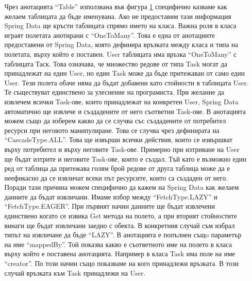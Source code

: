         \begin{figure}[h]
            \centering
            \caption{}
            \label{fig:user_entity}
        \end{figure}
        
        Чрез анотацията ``Table'' използвана във фигура \ref{fig:user_entity} специфично казваме как желаем таблицата да бъде именувана. Ако не предоставим тази информация Spring Data ще кръсти таблицата спрямо името на класа. Важна роля в класа играят полетата анотирани с ``OneToMany''. Това е една от анотациите предоставени от Spring Data, която дефинира връзката между класа и типа на полетата, върху който е поставен. User таблицата има връзка ``OneToMany'' с таблицата Таск. Това означава, че множество редове от типа Task могат да принадлежат на един User, но един Task може да бъде притежаван от само един User. Тези полета обаче няма да бъдат добавени като стойности в таблицата User. Те съществуват единствено за улеснение на програмиста. При желание да извлечем всички Task-ове, които принадлежат на конкретен User, Spring Data автоматично ще извлече и създадените от него съответни Task-ове.
        В анотацията можем също да изберем какво да се случва със създадените от потребител ресурси при неговото манипулиране. Това се случва чрез дефинирата на ``CascadeType.ALL''. Това ще извърши всички действия, които се извършват върху потребител и върху неговите Task-ове. Примерно при изтриване на User ще бъдат изтрите и неговите Task-ове, които е създал. 
        Тъй като е възможно един ред от таблица да притежава голям брой редове от друга таблица може да е неефикасно да се извличат всеки път ресурсите, които са създаден от него. Поради тази причина можем специфично да кажем на Spring Data как желаем данните да бъдат извличани. Имаме избор между ``FetchType.LAZY'' и ``FetchType.EAGER''. При първият начин данните ще бъдат извлечени единствено когато се извика Get метода на полето, а при вторият стойностите винаги ще бъдат извличани заедно с обекта. В конкретния случай съм избрал типът на извличане да бъде ``LAZY''.
        В анотацията е попълнен същo параметър на име ``mappedBy''. Той показва какво е съответното име на полето в класа върху който е поставена анотацията. Например в класа Task има поле на име ``creator''. По този начин също показваме на кого принадлежи връзката. В този случай връзката към Task принадлежи на User.
        
